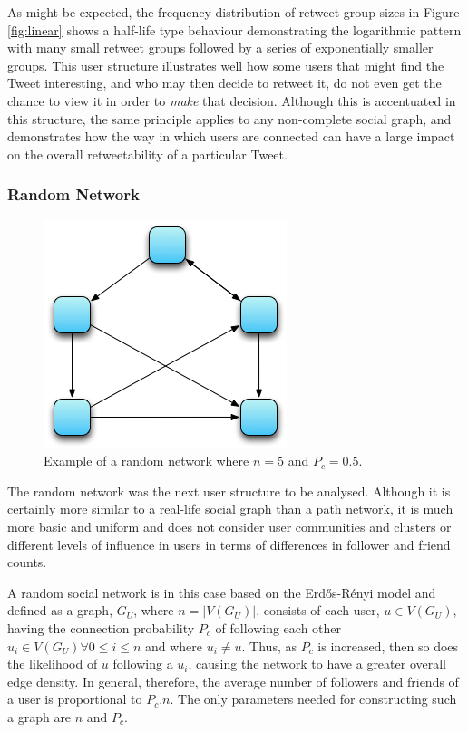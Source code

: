 As might be expected, the frequency distribution of retweet group sizes in Figure \ref{fig:linear} shows a half-life type behaviour demonstrating the logarithmic pattern with many small retweet groups followed by a series of exponentially smaller groups. This user structure illustrates well how some users that might find the Tweet interesting, and who may then decide to retweet it, do not even get the chance to view it in order to \textit{make} that decision. Although this is accentuated in this structure, the same principle applies to any non-complete social graph, and demonstrates how the way in which users are connected can have a large impact on the overall retweetability of a particular Tweet.


\subsubsection{Random Network}

\begin{figure}[h]
\centering
\includegraphics[scale=0.8]{4.Chapter2/Media/random_network.png} 
\caption{Example of a random network where $n = 5$ and $P_c = 0.5$.}
\label{fig:path_network}
\end{figure}

The random network was the next user structure to be analysed. Although it is certainly more similar to a real-life social graph than a path network, it is much more basic and uniform and does not consider user communities and clusters or different levels of influence in users in terms of differences in follower and friend counts.

A random social network is in this case based on the Erd\H{o}s-R\'{e}nyi model \cite{erdos60} and defined as a graph, $G_U$, where $n = |V(G_U)|$, consists of each user, $u \in V(G_U)$, having the connection probability $P_c$ of following each other $u_i \in V(G_U) \forall 0 \leq i \leq n$ and where $u_i \neq u$. Thus, as $P_c$ is increased, then so does the likelihood of $u$ following a $u_i$, causing the network to have a greater overall edge density. In general, therefore, the average number of followers and friends of a user is proportional to $P_c.n$. The only parameters needed for constructing such a graph are $n$ and $P_c$.

